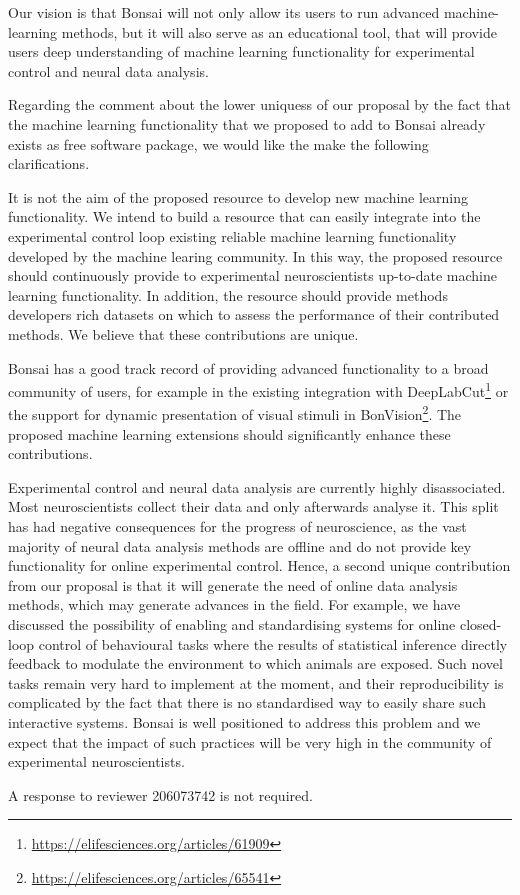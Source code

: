 \documentclass[11pt]{letter}
\begin{document}
\begin{letter}{
}
Our vision is that Bonsai will not only allow its users to run advanced
machine-learning methods, but it will also serve as an educational tool, that
will provide users deep understanding of machine learning functionality for
experimental control and neural data analysis.

Regarding the comment about the lower uniquess of our proposal by the fact that
the machine learning functionality that we proposed to add to Bonsai already
exists as free software package, we would like the make the following
clarifications.

It is not the aim of the proposed resource to develop new machine learning
functionality. We intend to build a resource that can easily integrate into the
experimental control loop existing reliable machine learning functionality
developed by the machine learing community. In this way, the
proposed resource should continuously provide to experimental neuroscientists
up-to-date machine learning functionality. In addition, the resource should
provide methods developers rich datasets on which to assess the performance of
their contributed methods. We believe that these contributions are unique.

Bonsai has a good track record of providing advanced functionality to a broad
community of users, for example in the existing integration with
DeepLabCut\footnote{\url{https://elifesciences.org/articles/61909}} or the
support for dynamic presentation of visual stimuli in
BonVision\footnote{\url{https://elifesciences.org/articles/65541}}. The
proposed machine learning extensions should significantly enhance these
contributions.

Experimental control and neural data analysis are currently highly
disassociated. Most neuroscientists collect their data and only afterwards
analyse it. This split has had negative consequences for the progress of
neuroscience, as the vast majority of neural data analysis methods are offline
and do not provide key functionality for online experimental control. Hence, a
second unique contribution from our proposal is that it will generate the need
of online data analysis methods, which may generate advances in the field. For
example, we have discussed the possibility of enabling and standardising
systems for online closed-loop control of behavioural tasks where the results
of statistical inference directly feedback to modulate the environment to which
animals are exposed. Such novel tasks remain very hard to implement at the
moment, and their reproducibility is complicated by the fact that there is no
standardised way to easily share such interactive systems. Bonsai is well
positioned to address this problem and we expect that the impact of such
practices will be very high in the community of experimental neuroscientists.

\pagebreak

A response to reviewer 206073742 is not required. 

\end{letter}
\end{document}
